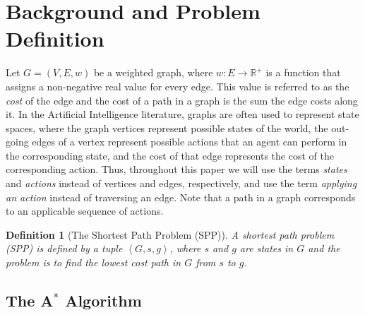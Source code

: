 \documentclass{aicom2e}
\newtheorem{definition}{Definition}
\newcommand{\astar}{A$^*$}
\newcommand{\tuple}[1]{\ensuremath{\left \langle #1 \right \rangle }}
\begin{document}
\section{Background and Problem Definition}


Let $G=(V,E,w)$ be a weighted graph, where $w:E\rightarrow \mathbb{R}^+$ is a function that assigns a non-negative real value for every edge. This value is referred to as the {\em cost} of the edge and the cost of a path in a graph is  the sum the edge costs along it. 
In the Artificial Intelligence literature, graphs are often used to represent state spaces, 
where the graph vertices represent possible states of the world, the out-going edges of a vertex represent possible actions that an agent can perform in the corresponding state, and the cost of that edge represents the cost of the corresponding action. 
Thus, throughout this paper we will use the terms {\em states} and {\em actions} instead of vertices and edges, respectively, and use the term {\em applying an action} instead of traversing an edge. Note that a path in a graph corresponds to an applicable sequence of actions. 

\begin{definition}[The Shortest Path Problem (SPP)]
A shortest path problem (SPP) is defined by a tuple $\tuple{G,s, g}$, 
where $s$ and $g$ are states in $G$ and the problem is to find the lowest cost path in $G$ from $s$ to $g$. 
\end{definition}

\subsection{The \astar{} Algorithm}
\end{document}
